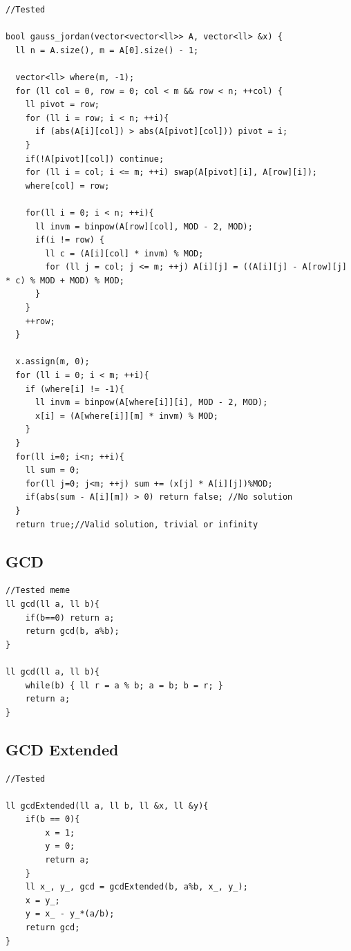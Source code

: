 \documentclass[10pt,a4paper,twocolumn]{article}
\begin{document}
	\begin{lstlisting}[style=cpp, title={gaussian-elimination.cpp}]
//Tested

bool gauss_jordan(vector<vector<ll>> A, vector<ll> &x) {
  ll n = A.size(), m = A[0].size() - 1;
 
  vector<ll> where(m, -1);
  for (ll col = 0, row = 0; col < m && row < n; ++col) {
    ll pivot = row;
    for (ll i = row; i < n; ++i){
      if (abs(A[i][col]) > abs(A[pivot][col])) pivot = i;
    }
    if(!A[pivot][col]) continue;
    for (ll i = col; i <= m; ++i) swap(A[pivot][i], A[row][i]);
    where[col] = row;
 
    for(ll i = 0; i < n; ++i){
      ll invm = binpow(A[row][col], MOD - 2, MOD);
      if(i != row) {
        ll c = (A[i][col] * invm) % MOD;
        for (ll j = col; j <= m; ++j) A[i][j] = ((A[i][j] - A[row][j] * c) % MOD + MOD) % MOD;
      }
    }
    ++row;
  }
 
  x.assign(m, 0);
  for (ll i = 0; i < m; ++i){
    if (where[i] != -1){
      ll invm = binpow(A[where[i]][i], MOD - 2, MOD);
      x[i] = (A[where[i]][m] * invm) % MOD;
    }
  }
  for(ll i=0; i<n; ++i){
    ll sum = 0;
    for(ll j=0; j<m; ++j) sum += (x[j] * A[i][j])%MOD;
    if(abs(sum - A[i][m]) > 0) return false; //No solution
  }
  return true;//Valid solution, trivial or infinity

	\end{lstlisting}

	\subsection{GCD}
	
	\begin{lstlisting}[style=cpp, title={gcd.cpp}]
//Tested meme
ll gcd(ll a, ll b){
    if(b==0) return a;
    return gcd(b, a%b);
}

ll gcd(ll a, ll b){
    while(b) { ll r = a % b; a = b; b = r; }
    return a;
}
	\end{lstlisting}
	\subsection{GCD Extended}
	
	\begin{lstlisting}[style=cpp, title={gcdExtended.cpp}]
//Tested

ll gcdExtended(ll a, ll b, ll &x, ll &y){
    if(b == 0){
        x = 1;
        y = 0;
        return a;
    }
    ll x_, y_, gcd = gcdExtended(b, a%b, x_, y_);
    x = y_;
    y = x_ - y_*(a/b);
    return gcd;
}
	\end{lstlisting}
	
\end{document}
